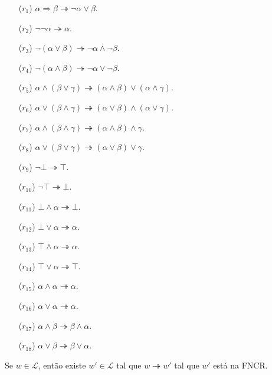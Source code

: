 \begin{itemize}
  \item[($r_1$)] $\alpha \Rightarrow \beta \twoheadrightarrow \neg \alpha \lor \beta$.
  \item[($r_2$)] $\neg \neg\alpha \twoheadrightarrow\alpha$.
  \item[($r_3$)] $\neg(\alpha \lor \beta) \twoheadrightarrow \neg \alpha \land \neg \beta$.
  \item[($r_4$)] $\neg(\alpha \land \beta) \twoheadrightarrow \neg \alpha \lor \neg \beta$.
  \item[($r_5$)] $\alpha \land (\beta \lor \gamma) \twoheadrightarrow (\alpha \land \beta) \lor (\alpha \land \gamma)$.
  \item[($r_6$)] $\alpha \lor (\beta \land \gamma) \twoheadrightarrow (\alpha \lor \beta) \land (\alpha \lor \gamma)$.
  \item[($r_7$)] $\alpha \land (\beta \land \gamma) \twoheadrightarrow (\alpha \land \beta) \land \gamma$.
  \item[($r_8$)] $\alpha \lor (\beta \lor \gamma) \twoheadrightarrow (\alpha \lor \beta) \lor \gamma$.
  \item[($r_9$)] $\neg \bot \twoheadrightarrow \top$.
  \item[($r_{10}$)] $\neg \top \twoheadrightarrow \bot$.
  \item[($r_{11}$)] $\bot \land \alpha \twoheadrightarrow\bot$.
  \item[($r_{12}$)] $\bot \lor \alpha \twoheadrightarrow\alpha$.
  \item[($r_{13}$)] $\top \land \alpha \twoheadrightarrow\alpha$.
  \item[($r_{14}$)] $\top \lor \alpha \twoheadrightarrow\top$.
  \item[($r_{15}$)] $\alpha \land \alpha \twoheadrightarrow \alpha$.
  \item[($r_{16}$)] $\alpha \lor \alpha \twoheadrightarrow \alpha$.
  \item[($r_{17}$)] $\alpha \land \beta \twoheadrightarrow \beta \land \alpha$.
  \item[($r_{18}$)] $\alpha \lor \beta \twoheadrightarrow \beta \lor \alpha$.
\end{itemize}

\begin{teorema}\label{teo:ConversaoParaFNCR}
  Se $w \in \mathcal{L}$, então existe $w' \in \mathcal{L}$ tal que $w \twoheadrightarrow  w'$ tal que $w'$ está na FNCR.
\end{teorema}

